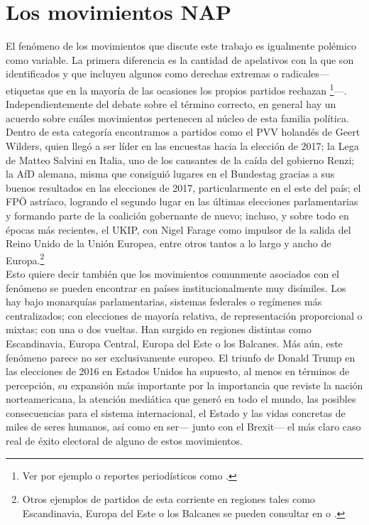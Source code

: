 \chapter{Los movimientos NAP}



El fenómeno de los movimientos que discute este trabajo es igualmente polémico como variable. La primera diferencia es la cantidad de apelativos con la que son identificados y que incluyen algunos como derechas extremas o radicales--- etiquetas que en la mayoría de las ocasiones los propios partidos rechazan \footnote{Ver por ejemplo \textcite[8]{Hainsworth16a} o reportes periodísticos como \textcite{LeParisien13,Sputnik17}.}---. Independientemente del debate sobre el término correcto, en general hay un acuerdo sobre cuáles movimientos pertenecen al núcleo de esta familia política. Dentro de esta categoría encontramos a partidos como el PVV holandés de Geert Wilders, quien llegó a ser líder en las encuestas hacia la elección de 2017; la Lega de Matteo Salvini en Italia, uno de los causantes de la caída del gobierno Renzi; la AfD alemana, misma que consiguió lugares en el Bundestag gracias a sus buenos resultados en las elecciones de 2017, particularmente en el este del país; el FPÖ astríaco, logrando el segundo lugar en las últimas elecciones parlamentarias y formando parte de la coalición gobernante de nuevo; incluso, y sobre todo en épocas más recientes, el UKIP, con Nigel Farage como impulsor de la salida del Reino Unido de la Unión Europea, entre otros tantos a lo largo y ancho de Europa.\footnote{Otros ejemplos de partidos de esta corriente en regiones tales como Escandinavia, Europa del Este o los Balcanes se pueden consultar  en \textcite{Mammone12} o \textcite{Hainsworth16a}.}\\ 

Esto quiere decir también que los movimientos comunmente asociados con el fenómeno se pueden encontrar en países institucionalmente muy disímiles. Los hay bajo monarquías parlamentarias, sistemas federales o regímenes más centralizados; con elecciones de mayoría relativa, de representación proporcional o mixtas; con una o dos vueltas. Han surgido en regiones distintas como Escandinavia, Europa Central, Europa del Este o los Balcanes. Más aún, este fenómeno parece no ser exclusivamente europeo. El triunfo de Donald Trump en las elecciones de 2016 en Estados Unidos ha supuesto, al menos en términos de percepción, su expansión más importante por la importancia que reviste la nación norteamericana, la atención mediática que generó en todo el mundo, las posibles consecuencias para el sistema internacional, el Estado y las vidas concretas de miles de seres humanos, así como en ser--- junto con el Brexit--- el más claro caso real de éxito electoral de alguno de estos movimientos.\\ 

